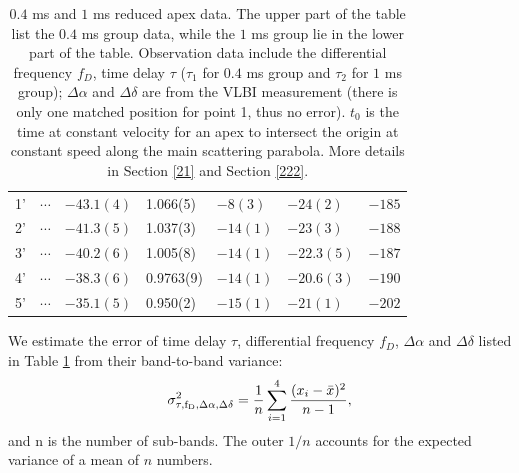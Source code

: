 \documentclass[useAMS,usenatbib]{mn2e}
\begin{document}
\begin{table}
\begin{tabular}{c|llllll}
1'&$ \cdots$ & $-43.1(4)$      & 1.066(5)    & $-8(3)$     & $-24(2)$   & $-185$   \\
2'&$\cdots$ & $-41.3(5)$    & 1.037(3)   & $-14(1)$     & $-23(3)$   & $-188$                                   \\
3'&$\cdots$ & $-40.2(6)$  & 1.005(8)    & $-14(1)$       & $-22.3(5)$  & $-187$                                   \\
4'&$\cdots$ & $-38.3(6)$  & 0.9763(9)   & $-14(1)$       & $-20.6(3)$  & $-190$                                    \\
5'&$\cdots$& $-35.1(5)$  & 0.950(2)   & $-15(1)$  & $-21(1)$   &$-202$                                   \\
 \hline                                 
\end{tabular}
\caption{ $0.4$ ms and $1$ ms reduced apex data. 
The upper part of the table list the $0.4$ ms group data, while the $1$ ms group lie in the lower part of the table. 
Observation data include the differential frequency $f_D$, time delay
$\tau$ ($\tau_1$ for $0.4$ ms group and $\tau_2$ for $1$ ms group);
$\Delta\alpha$ and $\Delta\delta$ are from the VLBI measurement (there is only one matched position for point 1, thus no error). 
$t_0$ is the time at constant velocity for an apex to intersect the
origin at constant speed along the main scattering parabola.  More
details in Section \ref{21} and Section \ref{222}.
}
\label{table:apex}
\end{table}
We estimate the error of time delay $\tau$, differential frequency
$f_D$, $\Delta\alpha$ and $\Delta\delta$  listed in Table
\ref{table:apex} from their band-to-band variance:
\begin{equation}
\sigma^2_{\rm \tau, f_D,\Delta\alpha, \Delta\delta} = \frac{1}{n}\sum^{4}_{i=1}\frac{(x_i-\bar{x})^2}{n-1},
\end{equation}
and n is the number of sub-bands. The outer $1/n$ accounts for the expected variance of a mean of $n$ numbers.

\end{document}

